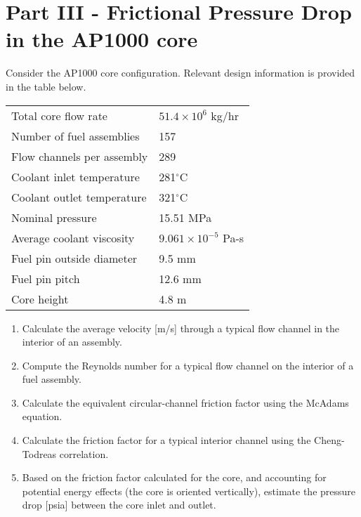 \begin{fullwidth}
\begin{enumerate}[resume]
\end{enumerate}

\pagebreak 

\section{Part III - Frictional Pressure Drop in the AP1000 core}
Consider the AP1000 core configuration.  Relevant design information is provided in the table below.

\begin{table}
\begin{tabular}{ l | l }
\toprule
Total core flow rate & $51.4 \times 10^6$ kg/hr \\
Number of fuel assemblies & 157 \\
Flow channels per assembly & 289 \\
Coolant inlet temperature & 281$^{\circ}$C \\
Coolant outlet temperature & 321$^{\circ}$C \\
Nominal pressure & 15.51 MPa \\
Average coolant viscosity & $9.061 \times 10^{-5}$ Pa-s \\
Fuel pin outside diameter & 9.5 mm \\
Fuel pin pitch & 12.6 mm \\
Core height & 4.8 m \\
\bottomrule
\end{tabular}
\end{table}

\begin{enumerate}[resume]
\item Calculate the average velocity [m/s] through a typical flow channel in the interior of an assembly.

\vspace{1.0 cm}

\item Compute the Reynolds number for a typical flow channel on the interior of a fuel assembly.

\vspace{1.0 cm}

\item Calculate the equivalent circular-channel friction factor using the McAdams equation.

\vspace{1.0 cm}


\item Calculate the friction factor for a typical interior channel using the Cheng-Todreas correlation.

\vspace{1.0 cm}

\item Based on the friction factor calculated for the core, and accounting for potential energy effects (the core is oriented vertically), estimate the pressure drop [psia] between the core inlet and outlet. 
\end{enumerate}


\end{fullwidth}
